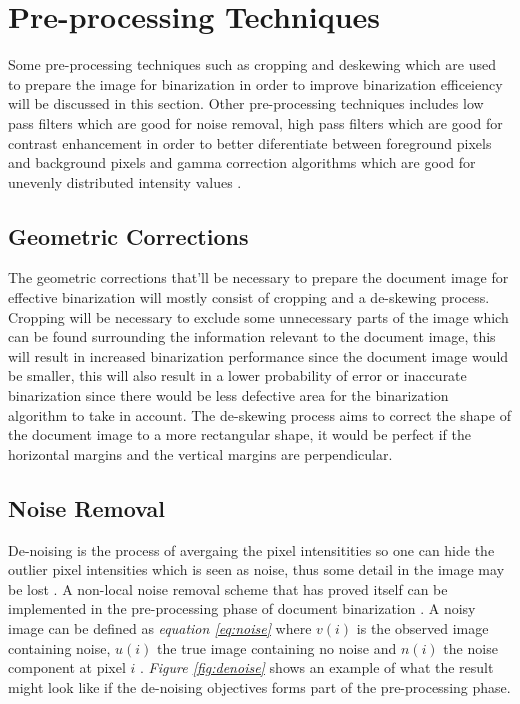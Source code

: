 \documentclass[11pt]{article}
\begin{document}
	\section{Pre-processing Techniques}
		Some pre-processing techniques such as cropping and deskewing which are used to prepare the image for binarization in order to improve binarization efficeiency will be discussed in this section. Other pre-processing techniques includes low pass filters which are good for noise removal, high pass filters which are good for contrast enhancement in order to better diferentiate between foreground pixels and background pixels and gamma correction algorithms which are good for unevenly distributed intensity values \cite{soua2015improved}.\\

		\subsection{Geometric Corrections}
			The geometric corrections that'll be necessary to prepare the document image for effective binarization will mostly consist of cropping and a de-skewing process. Cropping will be necessary to exclude some unnecessary parts of the image which can be found surrounding the information relevant to the document image, this will result in increased binarization performance since the document image would be smaller, this will also result in a lower probability of error or inaccurate binarization since there would be less defective area for the binarization algorithm to take in account. The de-skewing process aims to correct the shape of the document image to a more rectangular shape, it would be perfect if the horizontal margins and the vertical margins are perpendicular.\\%

		\subsection{Noise Removal} %
			De-noising is the process of avergaing the pixel intensitities so one can hide the outlier pixel intensities which is seen as noise, thus some detail in the image may be lost \cite{buades2005non}. A non-local noise removal scheme that has proved itself can be implemented in the pre-processing phase of document binarization \cite{chen2017broken}. A noisy image can be defined as \textit{equation \ref{eq:noise}} where $v(i)$ is the observed image containing noise, $u(i)$ the true image containing no noise and $n(i)$ the noise component at pixel $i$ \cite{buades2005non}. \textit{Figure \ref{fig:denoise}} shows an example of what the result might look like if the de-noising objectives forms part of the pre-processing phase.
\end{document}

